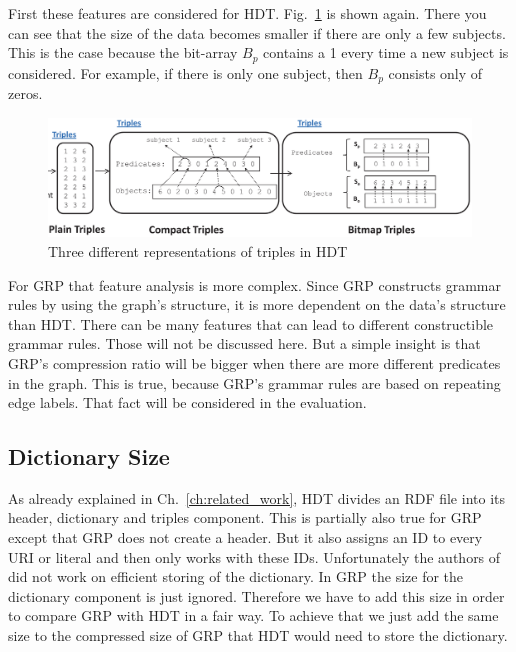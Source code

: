 First these features are considered for HDT. Fig.~\ref{fig:hdt_overview_1} is shown again. There you can see that the size of the data becomes smaller if there are only a few subjects. This is the case because the bit-array $B_p$ contains a 1 every time a new subject is considered. For example, if there is only one subject, then $B_p$ consists only of zeros.

\begin{figure}[h]
	\centering
	\includegraphics[width=1\textwidth]{figures/relatedwork/hdt1}
	\caption{Three different representations of triples in HDT}
	\label{fig:hdt_overview_1}
\end{figure}

For GRP that feature analysis is more complex. Since GRP constructs grammar rules by using the graph's structure, it is more dependent on the data's structure than HDT. There can be many features that can lead to different constructible grammar rules. Those will not be discussed here. But a simple insight is that GRP's compression ratio will be bigger when there are more different predicates in the graph. This is true, because GRP's grammar rules are based on repeating edge labels. That fact will be considered in the evaluation.

\subsection{Dictionary Size}

As already explained in Ch.~\ref{ch:related_work}, HDT divides an RDF file into its header, dictionary and triples component. This is partially also true for GRP except that GRP does not create a header. But it also assigns an ID to every URI or literal and then only works with these IDs. Unfortunately the authors of~\cite{maneth} did not work on efficient storing of the dictionary. In GRP the size for the dictionary component is just ignored. Therefore we have to add this size in order to compare GRP with HDT in a fair way. To achieve that we just add the same size to the compressed size of GRP that HDT would need to store the dictionary.

